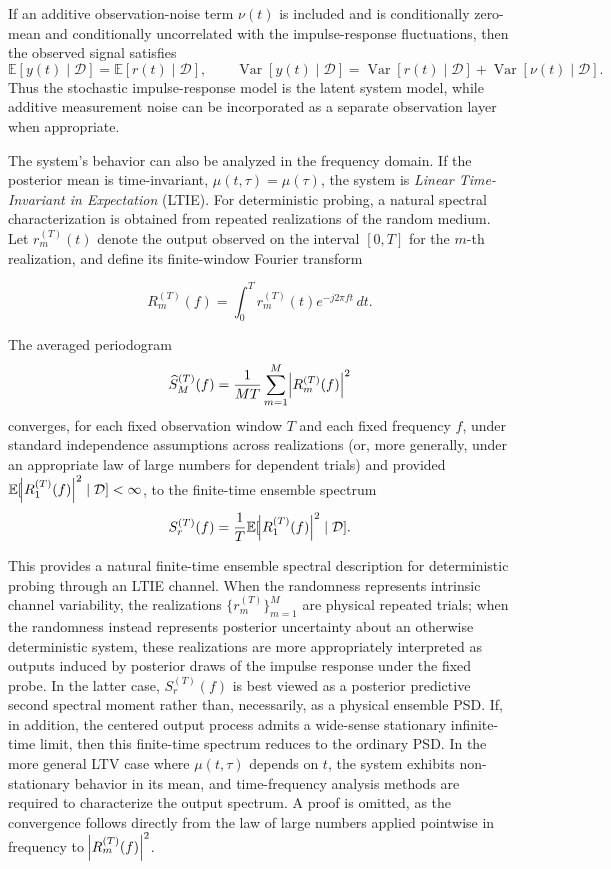 \documentclass[preprint,1p,times,authoryear]{elsarticle}
\begin{document}
If an additive observation-noise term $\nu(t)$ is included and is conditionally zero-mean and conditionally uncorrelated with the impulse-response fluctuations, then the observed signal satisfies
\[
\mathbb{E}[y(t)\mid\mathcal{D}] = \mathbb{E}[r(t)\mid\mathcal{D}],
\qquad
\operatorname{Var}[y(t)\mid\mathcal{D}] = \operatorname{Var}[r(t)\mid\mathcal{D}] + \operatorname{Var}[\nu(t)\mid\mathcal{D}].
\]
Thus the stochastic impulse-response model is the latent system model, while additive measurement noise can be incorporated as a separate observation layer when appropriate.


The system's behavior can also be analyzed in the frequency domain. If the posterior mean is time-invariant, $\mu(t,\tau)=\mu(\tau)$, the system is \emph{Linear Time-Invariant in Expectation} (LTIE). For deterministic probing, a natural spectral characterization is obtained from repeated realizations of the random medium. Let $r_m^{(T)}(t)$ denote the output observed on the interval $[0,T]$ for the $m$-th realization, and define its finite-window Fourier transform

\begin{equation}
R_m^{(T)}(f)=\int_0^T r_m^{(T)}(t)e^{-j2\pi ft}\,dt.
\end{equation}

The averaged periodogram
\begin{equation}
\widehat{S}_M^{(T)}(f)=\frac{1}{MT}\sum_{m=1}^M \abs{R_m^{(T)}(f)}^2
\end{equation}
converges, for each fixed observation window $T$ and each fixed frequency $f$, under standard independence assumptions across realizations (or, more generally, under an appropriate law of large numbers for dependent trials) and provided $\mathbb{E}[\abs{R_1^{(T)}(f)}^2 \mid \mathcal{D}]<\infty$, to the finite-time ensemble spectrum
\begin{equation}
S_r^{(T)}(f)=\frac{1}{T}\mathbb{E}[\abs{R_1^{(T)}(f)}^2 \mid \mathcal{D}].
\end{equation}

This provides a natural finite-time ensemble spectral description for deterministic probing through an LTIE channel. When the randomness represents intrinsic channel variability, the realizations $\{r_m^{(T)}\}_{m=1}^M$ are physical repeated trials; when the randomness instead represents posterior uncertainty about an otherwise deterministic system, these realizations are more appropriately interpreted as outputs induced by posterior draws of the impulse response under the fixed probe. In the latter case, $S_r^{(T)}(f)$ is best viewed as a posterior predictive second spectral moment rather than, necessarily, as a physical ensemble PSD. If, in addition, the centered output process admits a wide-sense stationary infinite-time limit, then this finite-time spectrum reduces to the ordinary PSD. In the more general LTV case where $\mu(t,\tau)$ depends on $t$, the system exhibits non-stationary behavior in its mean, and time-frequency analysis methods are required to characterize the output spectrum. A proof is omitted, as the convergence follows directly from the law of large numbers applied pointwise in frequency to $\abs{R_m^{(T)}(f)}^2$.
\end{document}

